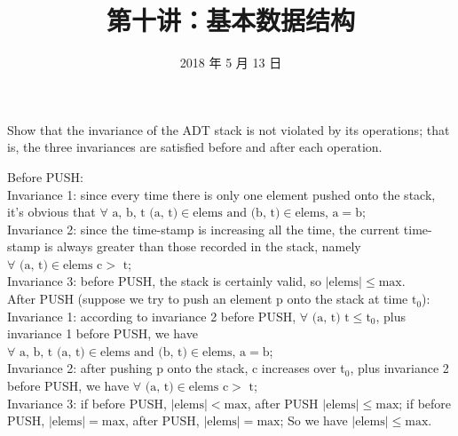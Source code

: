 \documentclass[12pt, a4paper, UTF8]{ctexart}
\title{第十讲：基本数据结构}
\date{2018 年 5 月 13 日}     %
\begin{document}
\maketitle
\noplagiarism	%
\beginrequired	%

\begin{problem}[MA: 2.6]	%
  Show that the invariance of the ADT stack is not violated by its operations; 
  that is, the three invariances are satisfied before and after each operation.
\end{problem}



\begin{solution}
  Before PUSH:\\
  \indent Invariance 1: since every time there is only one element pushed onto the stack, 
  it's obvious that $\forall \text{ a, b, t (a, t)}\in \text{elems and (b, t)}\in 
  \text{elems, a}=\text{b}$;\\
  \indent Invariance 2: since the time-stamp is increasing all the time, the current time-stamp 
  is always greater than those recorded in the stack, namely $\forall \text{ (a, t)}\in 
  \text{elems c}>\text{ t}$;\\
  \indent Invariance 3: before PUSH, the stack is certainly valid, so $|\text{elems}|\leq\text{max}$.\\
  After PUSH (suppose we try to push an element p onto the stack at time $\text{t}_{0}$):\\
  \indent Invariance 1: according to invariance 2 before PUSH, $\forall\text{ (a, t) t}\leq\text{t}_{0}$, 
  plus invariance 1 before PUSH, we have $\forall \text{ a, b, t (a, t)}\in \text{elems 
  and (b, t)}\in \text{elems, a}=\text{b}$;\\
  \indent Invariance 2: after pushing p onto the stack, c increases over t$_{0}$, plus 
  invariance 2 before PUSH, we have $\forall \text{ (a, t)}\in \text{elems c}>\text{ t}$;\\
  \indent Invariance 3: if before PUSH, $|\text{elems}|<\text{max}$, after PUSH $|\text{elems}|\leq\text{max}$; 
  if before PUSH, $|\text{elems}|=\text{max}$, after PUSH, $|\text{elems}|=\text{max}$; 
  So we have $|\text{elems}|\leq\text{max}$.
\end{solution}
\end{document}
